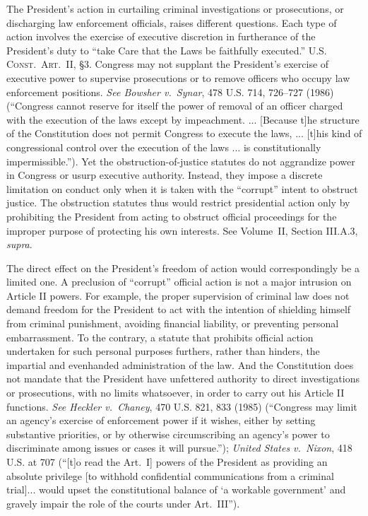 The President’s action in curtailing criminal investigations or prosecutions, or discharging law enforcement officials, raises different questions.
Each type of action involves the exercise of executive discretion in furtherance of the President’s duty to “take Care that the Laws be faithfully executed.”
\textsc{U.S. Const.\ Art.~II}, \S 3.
Congress may not supplant the President’s exercise of executive power to supervise prosecutions or to remove officers who occupy law enforcement positions.
\textit{See Bowsher v.\ Synar}, 478 U.S. 714, 726--727 (1986) (“Congress cannot reserve for itself the power of removal of an officer charged with the execution of the laws except by impeachment. ... [Because t]he structure of the Constitution does not permit Congress to execute the laws, ... [t]his kind of congressional control over the execution of the laws ... is constitutionally impermissible.”).
Yet the obstruction-of-justice statutes do not aggrandize power in Congress or usurp executive authority.
Instead, they impose a discrete limitation on conduct only when it is taken with the “corrupt” intent to obstruct justice.
The obstruction statutes thus would restrict presidential action only by prohibiting the President from acting to obstruct official proceedings for the improper purpose of protecting his own interests.
See Volume~II, Section III.A.3, \textit{supra}.

The direct effect on the President’s freedom of action would correspondingly be a limited one.
A preclusion of “corrupt” official action is not a major intrusion on Article II powers.
For example, the proper supervision of criminal law does not demand freedom for the President to act with the intention of shielding himself from criminal punishment, avoiding financial liability, or preventing personal embarrassment.
To the contrary, a statute that prohibits official action undertaken for such personal purposes furthers, rather than hinders, the impartial and evenhanded administration of the law.
And the Constitution does not mandate that the President have unfettered authority to direct investigations or prosecutions, with no limits whatsoever, in order to carry out his Article II functions.
\textit{See Heckler v.\ Chaney}, 470 U.S. 821, 833 (1985) (“Congress may limit an agency’s exercise of enforcement power if it wishes, either by setting substantive priorities, or by otherwise circumscribing an agency’s power to discriminate among issues or cases it will pursue.”);
\textit{United States v.\ Nixon}, 418 U.S. at 707 (“[t]o read the Art.~I] powers of the President as providing an absolute privilege [to withhold confidential communications from a criminal trial]... would upset the constitutional balance of ‘a workable government’ and gravely impair the role of the courts under Art.~III”).

